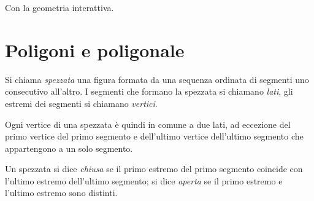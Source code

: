 \ifcoding
Con la geometria interattiva.


\fi


% 




\section{Poligoni e poligonale}
\label{sect:poligoni}

\begin{definizione}
Si chiama \emph{spezzata} una figura formata da una sequenza ordinata 
di segmenti uno consecutivo all'altro. I segmenti che formano la 
spezzata si chiamano \emph{lati}, gli estremi dei segmenti si 
chiamano \emph{vertici}.
\end{definizione}

\begin{inaccessibleblock}
\begin{center}\end{center}
\end{inaccessibleblock}

Ogni vertice di una spezzata è quindi in comune a due lati, ad 
eccezione del primo vertice del primo segmento e dell'ultimo vertice 
dell'ultimo segmento che appartengono a un solo segmento.

\begin{definizione}
Un spezzata si dice \emph{chiusa} se il primo estremo del primo 
segmento coincide con l'ultimo estremo dell'ultimo segmento; si dice 
\emph{aperta} se il primo estremo e l'ultimo estremo sono distinti.
\end{definizione}

